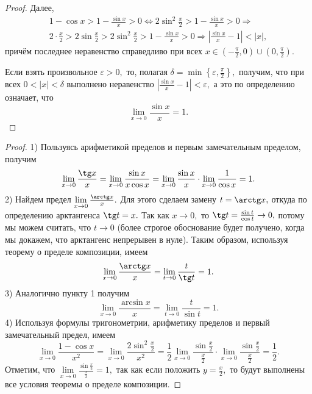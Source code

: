 \begin{proof}
    Далее,
    \begin{multline*}
        1-\cos x>1-\frac{\sin x}{x}>0\Leftrightarrow
        2\sin^2\frac{x}{2}>1-\frac{\sin x}{x}>0\Rightarrow\\
        2\cdot\frac{x}{2}>2\sin\frac{x}{2}
        >2\sin^2\frac{x}{2}>1-\frac{\sin x}{x}>0
        \Rightarrow\left|\frac{\sin x}{x}-1\right|<
        |x|,
    \end{multline*}
    причём последнее неравенство справедливо
    при всех $x\in(-\frac{\pi}{2}, 0)\cup
        (0, \frac{\pi}{2}).$

    Если взять произвольное $\varepsilon>0,$
    то, полагая
    $\delta=\min\left\{\varepsilon,
        \frac{\pi}{2}\right\},$
    получим, что при всех $0<|x|<\delta$ выполнено
    неравенство $\left|\frac{\sin x}{x}-1\right|<
        \varepsilon,$ а это по определению означает, что
    $$
        \lim\limits_{x\rightarrow0}
        \frac{\sin x}{x}=1.
    $$
\end{proof}

\begin{proof}
    1) Пользуясь арифметикой пределов и первым
    замечательным пределом, получим
    $$
        \lim\limits_{x\rightarrow0}
        \frac{\tg x}{x}=\lim\limits_{x\rightarrow0}
        \frac{\sin x}{x\cos x}=\lim\limits_{x\rightarrow0}
        \frac{\sin x}{x}\cdot\lim\limits_{x\rightarrow0}
        \frac{1}{\cos x}=1.
    $$
    2) Найдем предел $\lim\limits_{x\rightarrow0}
        \frac{\arctg x}{x}.$ Для этого сделаем замену
    $t=\arctg x,$ откуда по определению арктангенса
    $\tg t=x.$ Так как $x\rightarrow0,$ то
    $\tg t=\frac{\sin t}{\cos t}\rightarrow0,$
    потому мы можем считать, что $t\rightarrow0$
    (более строгое обоснование будет получено,
    когда мы докажем, что арктангенс непрерывен
    в нуле).
    Таким образом, используя теорему о пределе
    композиции, имеем
    $$
        \lim\limits_{x\rightarrow0}
        \frac{\arctg x}{x}=\lim\limits_{t\rightarrow0}
        \frac{t}{\tg t}=1.
    $$
    3) Аналогично пункту 1 получим
    $$
        \lim\limits_{x\rightarrow0}
        \frac{\arcsin x}{x}=\lim\limits_{t\rightarrow0}
        \frac{t}{\sin t}=1.
    $$
    4) Используя формулы тригонометрии, арифметику
    пределов и первый замечательный предел, имеем
    $$
        \lim\limits_{x\rightarrow0}
        \frac{1-\cos x}{x^2}=\lim\limits_{x\rightarrow0}
        \frac{2\sin^2\frac{x}{2}}{x^2}=
        \frac{1}{2}\lim\limits_{x\rightarrow0}
        \frac{\sin\frac{x}{2}}{\frac{x}{2}}
        \cdot\lim\limits_{x\rightarrow0}
        \frac{\sin\frac{x}{2}}{\frac{x}{2}}=\frac{1}{2}.
    $$
    Отметим, что $\lim\limits_{x\rightarrow0}
        \frac{\sin\frac{x}{2}}{\frac{x}{2}}=1,$ так как
    если положить $y=\frac{x}{2},$ то будут
    выполнены все условия теоремы о пределе
    композиции.
\end{proof}

